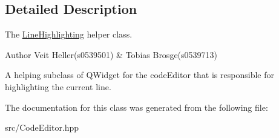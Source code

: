 \subsection{Detailed Description}
The \hyperlink{classLineHighlighting}{Line\+Highlighting} helper class. 

\begin{DoxyAuthor}{Author}
Veit Heller(s0539501) \& Tobias Brosge(s0539713)
\end{DoxyAuthor}
A helping subclass of Q\+Widget for the code\+Editor that is responsible for highlighting the current line. 

The documentation for this class was generated from the following file\+:\begin{DoxyCompactItemize}
\item 
src/Code\+Editor.\+hpp\end{DoxyCompactItemize}
